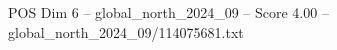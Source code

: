 \begin{textsample}{POS Dim 6 – global\_north\_2024\_09 – Score 4.00 – global\_north\_2024\_09/114075681.txt}
\end{textsample}
